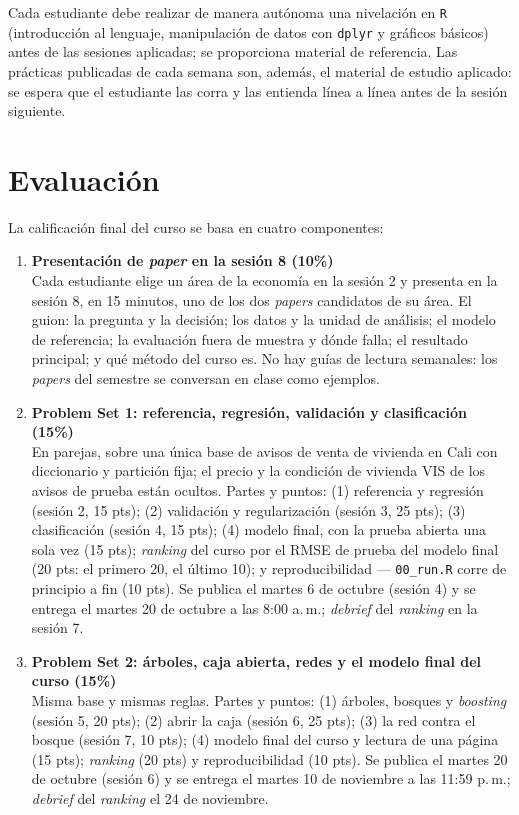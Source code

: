 \documentclass[12pt,a4paper]{article}
\begin{document}
Cada estudiante debe realizar de manera autónoma una nivelación en \texttt{R} (introducción al lenguaje, manipulación de datos con \texttt{dplyr} y gráficos básicos) antes de las sesiones aplicadas; se proporciona material de referencia. Las prácticas publicadas de cada semana son, además, el material de estudio aplicado: se espera que el estudiante las corra y las entienda línea a línea antes de la sesión siguiente.

\section{Evaluación}

La calificación final del curso se basa en cuatro componentes:

\begin{enumerate}
    \item \textbf{Presentación de \emph{paper} en la sesión 8 (10\%)} \\
    Cada estudiante elige un área de la economía en la sesión 2 y presenta en la sesión 8, en 15 minutos, uno de los dos \emph{papers} candidatos de su área. El guion: la pregunta y la decisión; los datos y la unidad de análisis; el modelo de referencia; la evaluación fuera de muestra y dónde falla; el resultado principal; y qué método del curso es. No hay guías de lectura semanales: los \emph{papers} del semestre se conversan en clase como ejemplos.

    \item \textbf{Problem Set 1: referencia, regresión, validación y clasificación (15\%)} \\
    En parejas, sobre una única base de avisos de venta de vivienda en Cali con diccionario y partición fija; el precio y la condición de vivienda VIS de los avisos de prueba están ocultos. Partes y puntos: (1) referencia y regresión (sesión 2, 15 pts); (2) validación y regularización (sesión 3, 25 pts); (3) clasificación (sesión 4, 15 pts); (4) modelo final, con la prueba abierta una sola vez (15 pts); \emph{ranking} del curso por el RMSE de prueba del modelo final (20 pts: el primero 20, el último 10); y reproducibilidad --- \texttt{00\_run.R} corre de principio a fin (10 pts). Se publica el martes 6 de octubre (sesión 4) y se entrega el martes 20 de octubre a las 8:00 a.\,m.; \emph{debrief} del \emph{ranking} en la sesión 7.

    \item \textbf{Problem Set 2: árboles, caja abierta, redes y el modelo final del curso (15\%)} \\
    Misma base y mismas reglas. Partes y puntos: (1) árboles, bosques y \emph{boosting} (sesión 5, 20 pts); (2) abrir la caja (sesión 6, 25 pts); (3) la red contra el bosque (sesión 7, 10 pts); (4) modelo final del curso y lectura de una página (15 pts); \emph{ranking} (20 pts) y reproducibilidad (10 pts). Se publica el martes 20 de octubre (sesión 6) y se entrega el martes 10 de noviembre a las 11:59 p.\,m.; \emph{debrief} del \emph{ranking} el 24 de noviembre.


\end{enumerate}
\end{document}

